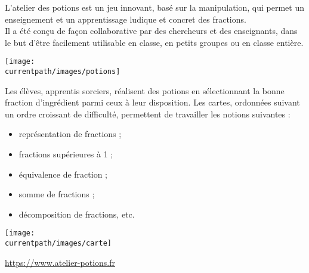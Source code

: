 \begin{enigme}
    L’atelier des potions est un jeu innovant, basé sur la manipulation, qui permet un enseignement et un apprentissage ludique et concret des fractions. \\  
Il a été conçu de façon collaborative par des chercheurs et des enseignants, dans le but d'être facilement utilisable en classe, en petits groupes ou en classe entière. \\
    \begin{center}
      \texttt{[image: \\currentpath/images/potions]}
    \end{center}

    \begin{minipage}{0.7\linewidth}
        Les élèves, apprentis sorciers, réalisent des potions en sélectionnant la bonne fraction d’ingrédient parmi ceux à leur disposition. Les cartes, ordonnées suivant un ordre croissant de difficulté, permettent de travailler les notions suivantes :
        \begin{itemize}
        \item représentation de fractions ;
        \item fractions supérieures à 1 ;
        \item équivalence de fraction ;
        \item somme de fractions ;
        \item décomposition de fractions, etc.
        \end{itemize}
    \end{minipage}
    \hspace*{5mm}
    \begin{minipage}{0.3\linewidth}    
        \begin{center}
           \texttt{[image: \\currentpath/images/carte]}
        \end{center}
    \end{minipage}

    \vfill
    \begin{flushright}
    \href{https://www.atelier-potions.fr}{{\small https://www.atelier-potions.fr}}
    \end{flushright}
\end{enigme}

